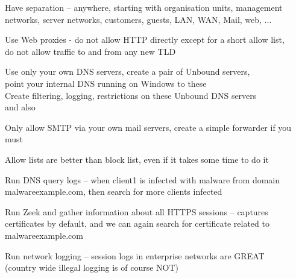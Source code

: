 \documentclass[Screen16to9,17pt]{foils}
\begin{document}











\begin{list2}
\item Have separation -- anywhere, starting with organisation units, management networks, server networks, customers, guests, LAN, WAN, Mail, web, ...
\item Use Web proxies - do not allow HTTP directly except for a short allow list, \\
do not allow traffic to and from any new TLD
\item Use only your own DNS servers, create a pair of Unbound servers, \\
point your internal DNS running on Windows to these\\
Create filtering, logging, restrictions on these Unbound DNS servers\\
 and also 
\item Only allow SMTP via your own mail servers, create a simple forwarder if you must
\end{list2}

Allow lists are better than block list, even if it takes some time to do it



\begin{list2}
\item Run DNS query logs -- when client1 is infected with malware from domain malwareexample.com, then search for more clients infected
\item Run Zeek and gather information about all HTTPS sessions -- captures certificates by default, and we can again search for certificate related to malwareexample.com
\item Run network logging -- session logs in enterprise networks are GREAT \\
(country wide illegal logging is of course NOT)
\end{list2}
\end{document}
